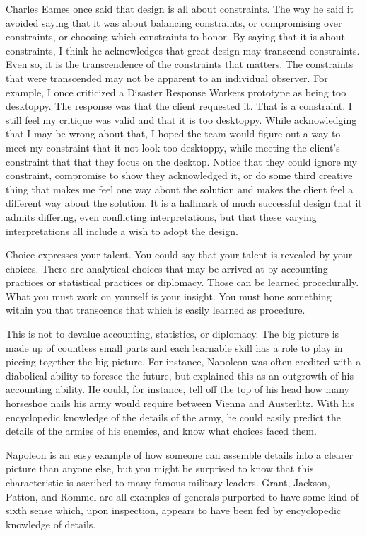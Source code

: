 Charles Eames once said that design is all about constraints. The way he
said it avoided saying that it was about balancing constraints, or
compromising over constraints, or choosing which constraints to honor.
By saying that it is about constraints, I think he acknowledges that
great design may transcend constraints. Even so, it is the transcendence
of the constraints that matters. The constraints that were transcended
may not be apparent to an individual observer. For example, I once
criticized a Disaster Response Workers prototype as being too desktoppy.
The response was that the client requested it. That is a constraint. I
still feel my critique was valid and that it is too desktoppy. While
acknowledging that I may be wrong about that, I hoped the team would
figure out a way to meet my constraint that it not look too desktoppy,
while meeting the client's constraint that that they focus on the
desktop. Notice that they could ignore my constraint, compromise to show
they acknowledged it, or do some third creative thing that makes me feel
one way about the solution and makes the client feel a different way
about the solution. It is a hallmark of much successful design that it
admits differing, even conflicting interpretations, but that these
varying interpretations all include a wish to adopt the design.

Choice expresses your talent. You could say that your talent is revealed
by your choices. There are analytical choices that may be arrived at by
accounting practices or statistical practices or diplomacy. Those can be
learned procedurally. What you must work on yourself is your insight.
You must hone something within you that transcends that which is easily
learned as procedure.

This is not to devalue accounting, statistics, or diplomacy. The big
picture is made up of countless small parts and each learnable skill has
a role to play in piecing together the big picture. For instance,
Napoleon was often credited with a diabolical ability to foresee the
future, but explained this as an outgrowth of his accounting ability. He
could, for instance, tell off the top of his head how many horseshoe
nails his army would require between Vienna and Austerlitz. With his
encyclopedic knowledge of the details of the army, he could easily
predict the details of the armies of his enemies, and know what choices
faced them.

Napoleon is an easy example of how someone can assemble details into a
clearer picture than anyone else, but you might be surprised to know
that this characteristic is ascribed to many famous military leaders.
Grant, Jackson, Patton, and Rommel are all examples of generals
purported to have some kind of sixth sense which, upon inspection,
appears to have been fed by encyclopedic knowledge of details.

